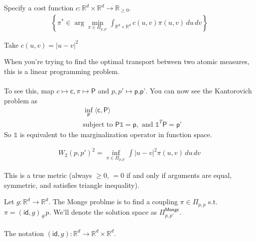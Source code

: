 \documentclass[11pt,fleqn]{article}
\numberwithin{equation}{section}
\theoremstyle{definition}
\theoremstyle{definition}
\begin{document}
\begin{definition}
	 Specify a cost function $c: \mathbb R^d \times \mathbb R^d \to \mathbb R_{\geq 0}$.
	\begin{align}
		\left\{ \pi^* \in \arg \min_{\pi \in \Pi_{p,p'}} \int_{\mathbb R^d \times \mathbb R^d} c(u,v) \pi(u,v) \, du \, dv \right\}
	\end{align}
\end{definition}
\begin{eg}
	Take $c(u,v) = |u-v|^2$
\end{eg}
\begin{remark}
	When you're trying to find the optimal transport between two atomic measures, this is a linear programming problem.\\
	\\
	To see this, map $c \mapsto \textsf{c}, \pi \mapsto \textsf{P}$ and $p,p' \mapsto \textsf{p,p'}$. You can now see the Kantorovich problem as
	\begin{align}
		&\inf_{\textsf{P}} \langle \textsf{c},\textsf{P}\rangle\\
		& \text{subject to } \textsf{P} \mathds 1 = \textsf{p}, \text{ and } \mathds 1^T \textsf{P} = \textsf{p'}
	\end{align}
	So $\mathds 1$ is equivalent to the marginalization operator in function space.
\end{remark}

\begin{definition} 
	\begin{align} 
		W_2(p,p')^2 = \inf_{\pi \in \Pi_{p,p'}} \int |u-v|^2 \pi(u,v) \, du \, dv
	\end{align}
\end{definition}
This is a true metric (always $\geq 0$, $=0$ if and only if arguments are equal, symmetric, and satisfies triangle inequality).


\begin{definition}
	 Let $g : \mathbb R^d \to \mathbb R^d$. The Monge problme is to find a coupling $\pi \in \Pi_{p,p}$ s.t. $\pi = (\textsf{id}, g)_\# p$. We'll denote the solution space as $\Pi^{\textsf{Monge}}_{p,p'}$.
	\\
	\\
	The notation $(\textsf{id}, g): \mathbb R^d \to \mathbb R^d \times \mathbb R^d$.
\end{definition}
\end{document}
